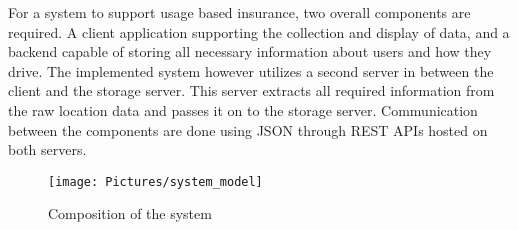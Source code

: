 For a system to support usage based insurance, two overall components are required. A client application supporting the collection and display of data, and a backend capable of storing all necessary information about users and how they drive. The implemented system however utilizes a second server in between the client and the storage server. This server extracts all required information from the raw location data and passes it on to the storage server. Communication between the components are done using JSON through REST APIs hosted on both servers.

\begin{figure}[tb]
\centering
\texttt{[image: Pictures/system\_model]}
\caption{Composition of the system}
\label{fig:system_model}
\end{figure}